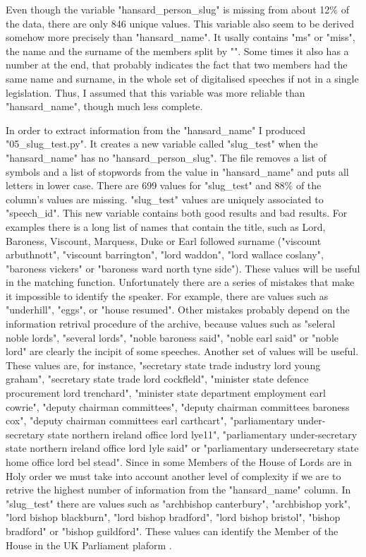 Even though the variable "hansard\_person\_slug" is missing from about 12\% of the data,%
there are only 846 unique values. This variable also seem to be derived somehow more precisely than "hansard\_name". It usally contains "ms" or "miss", the name and the surname of the members split by "\-". Some times it also has a number at the end, that probably indicates the fact that two members had the same name and surname, in the whole set of digitalised speeches if not in a single legislation. Thus, I assumed that this variable was more reliable than "hansard\_name", though much less complete.

In order to extract information from the "hansard\_name" I produced "05\_slug\_test.py". It creates a new variable called "slug\_test" when the "hansard\_name" has no "hansard\_person\_slug".
The file removes a list of symbols and a list of stopwords from the value in "hansard\_name" and puts all letters in lower case. There are 699 values for "slug\_test" and 88\% of the column's values are missing.%
"slug\_test" values are uniquely associated to "speech\_id".
This new variable contains both good results and bad results. For examples there is a long list of names that contain the title, such as Lord, Baroness, Viscount, Marquess, Duke or Earl followed surname ("viscount arbuthnott", "viscount barrington", "lord waddon", "lord wallace coslany", "baroness vickers" or "baroness ward north tyne side"). These values will be useful in the matching function. Unfortunately there are a series of mistakes that make it impossible to identify the speaker. For example, there are values such as "underhill", "eggs", or "house resumed". Other mistakes probably depend on the information retrival procedure of the archive, because values such as "seleral noble lords", "several lords", "noble baroness said", "noble earl said" or "noble lord" are clearly the incipit of some speeches.
Another set of values will be useful. These values are, for instance, "secretary state trade industry lord young graham", "secretary state trade lord cockfleld", "minister state defence procurement lord trenchard", "minister state department employment earl cowrie", "deputy chairman committees", "deputy chairman committees baroness cox", "deputy chairman committees earl carthcart", "parliamentary under-secretary state northern ireland office lord lye11", "parliamentary under-secretary state northern ireland office lord lyle said" or "parliamentary undersecretary state home office lord bel stead".
Since in some Members of the House of Lords are in Holy order we must take into account another level of complexity if we are to retrive the highest number of information from the "hansard\_name" column. In "slug\_test" there are values such as "archbishop canterbury", "archbishop york", "lord bishop blackburn", "lord bishop bradford", "lord bishop bristol", "bishop bradford" or "bishop guildford". These values can identify the Member of the House in the UK Parliament plaform \cite{MPsLordsUK}.

